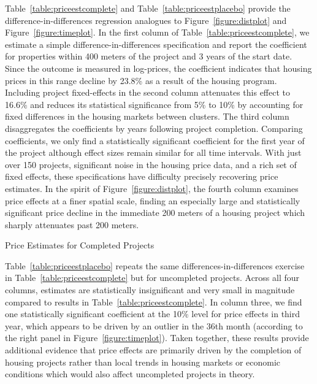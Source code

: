 \documentclass[12pt]{article}
\begin{document}
Table~\ref{table:priceestcomplete} and Table~\ref{table:priceestplacebo} provide the difference-in-differences regression analogues to Figure~\ref{figure:distplot} and Figure~\ref{figure:timeplot}.  In the first column of Table~\ref{table:priceestcomplete}, we estimate a simple difference-in-differences specification and report the coefficient for properties within 400 meters of the project and 3 years of the start date.  Since the outcome is measured in log-prices, the coefficient indicates that housing prices in this range decline by 23.8\% as a result of the housing program.  Including project fixed-effects in the second column attenuates this effect to 16.6\% and reduces its statistical significance from 5\% to 10\% by accounting for fixed differences in the housing markets between clusters.  The third column disaggregates the coefficients by years following project completion.  Comparing coefficients, we only find a statistically significant coefficient for the first year of the project although effect sizes remain similar for all time intervals.  With just over 150 projects, significant noise in the housing price data, and a rich set of fixed effects, these specifications have difficulty precisely recovering price estimates.  In the spirit of Figure~\ref{figure:distplot}, the fourth column examines price effects at a finer spatial scale, finding an especially large and statistically significant price decline in the immediate 200 meters of a housing project which sharply attenuates past 200 meters.

\begin{table}
\caption{Price Estimates for Completed Projects}\label{table:priceestcomplete}
\centering

\end{table}

Table~\ref{table:priceestplacebo} repeats the same differences-in-differences exercise in Table~\ref{table:priceestcomplete} but for uncompleted projects.  Across all four columns, estimates are statistically insignificant and very small in magnitude compared to results in Table~\ref{table:priceestcomplete}.  In column three, we find one statistically significant coefficient at the 10\% level for price effects in third year, which appears to be driven by an outlier in the 36th month (according to the right panel in Figure~\ref{figure:timeplot}).  Taken together, these results provide additional evidence that price effects are primarily driven by the completion of housing projects rather than local trends in housing markets or economic conditions which would also affect uncompleted projects in theory.
\end{document}
